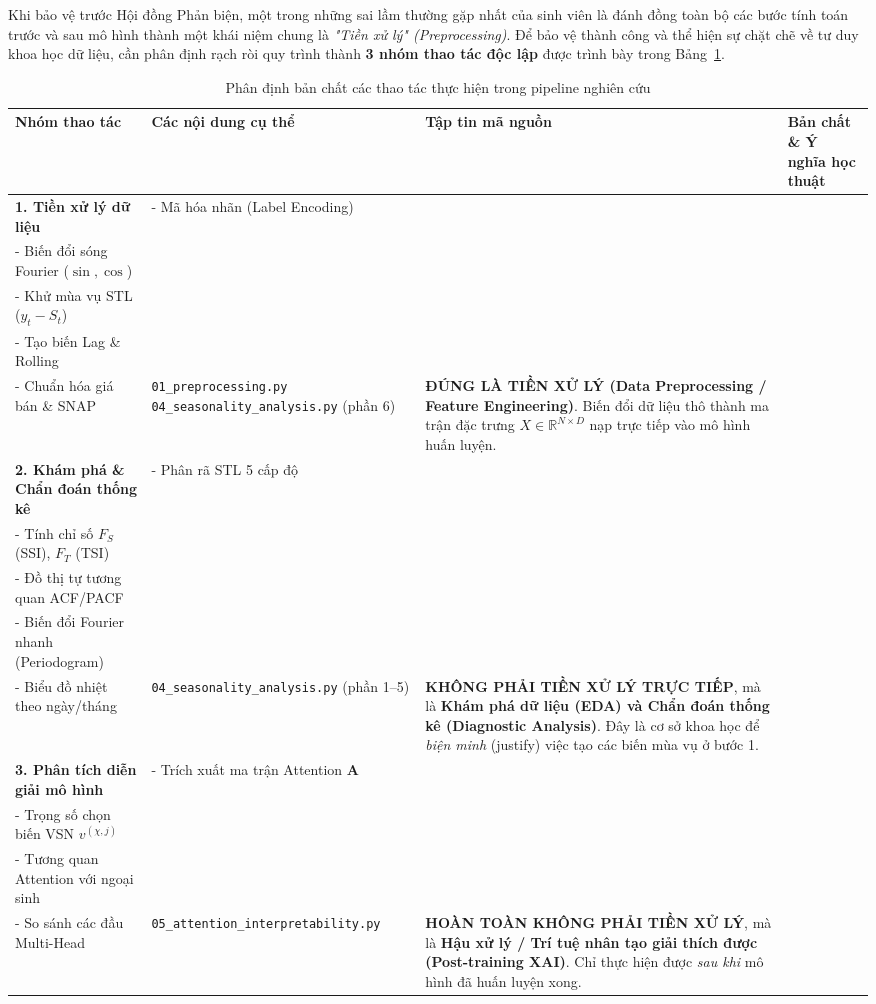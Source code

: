 \documentclass[12pt,a4paper,oneside]{article}
\begin{document}
Khi bảo vệ trước Hội đồng Phản biện, một trong những sai lầm thường gặp nhất của sinh viên là đánh đồng toàn bộ các bước tính toán trước và sau mô hình thành một khái niệm chung là \textit{"Tiền xử lý" (Preprocessing)}. Để bảo vệ thành công và thể hiện sự chặt chẽ về tư duy khoa học dữ liệu, cần phân định rạch ròi quy trình thành \textbf{3 nhóm thao tác độc lập} được trình bày trong Bảng~\ref{tab:phan_dinh_thao_tac}.

\begin{table}[htbp]
\centering
\small
\caption{Phân định bản chất các thao tác thực hiện trong pipeline nghiên cứu}
\label{tab:phan_dinh_thao_tac}
\begin{tabularx}{\textwidth}{l p{3.8cm} p{2.8cm} X}
\toprule
\textbf{Nhóm thao tác} & \textbf{Các nội dung cụ thể} & \textbf{Tập tin mã nguồn} & \textbf{Bản chất \& Ý nghĩa học thuật} \\
\midrule
\textbf{1. Tiền xử lý dữ liệu} & 
- Mã hóa nhãn (Label Encoding)\\
- Biến đổi sóng Fourier ($\sin, \cos$)\\
- Khử mùa vụ STL ($y_t - S_t$)\\
- Tạo biến Lag \& Rolling\\
- Chuẩn hóa giá bán \& SNAP &
\texttt{01\_preprocessing.py}\newline
\texttt{04\_seasonality\_analysis.py} (phần 6) &
\textbf{ĐÚNG LÀ TIỀN XỬ LÝ (Data Preprocessing / Feature Engineering)}. Biến đổi dữ liệu thô thành ma trận đặc trưng $X \in \mathbb{R}^{N \times D}$ nạp trực tiếp vào mô hình huấn luyện. \\
\addlinespace
\textbf{2. Khám phá \& Chẩn đoán thống kê} & 
- Phân rã STL 5 cấp độ\\
- Tính chỉ số $F_S$ (SSI), $F_T$ (TSI)\\
- Đồ thị tự tương quan ACF/PACF\\
- Biến đổi Fourier nhanh (Periodogram)\\
- Biểu đồ nhiệt theo ngày/tháng &
\texttt{04\_seasonality\_analysis.py} (phần 1--5) &
\textbf{KHÔNG PHẢI TIỀN XỬ LÝ TRỰC TIẾP}, mà là \textbf{Khám phá dữ liệu (EDA) và Chẩn đoán thống kê (Diagnostic Analysis)}. Đây là cơ sở khoa học để \textit{biện minh} (justify) việc tạo các biến mùa vụ ở bước 1. \\
\addlinespace
\textbf{3. Phân tích diễn giải mô hình} & 
- Trích xuất ma trận Attention $\mathbf{A}$\\
- Trọng số chọn biến VSN $v^{(\chi,j)}$\\
- Tương quan Attention với ngoại sinh\\
- So sánh các đầu Multi-Head &
\texttt{05\_attention\_interpretability.py} &
\textbf{HOÀN TOÀN KHÔNG PHẢI TIỀN XỬ LÝ}, mà là \textbf{Hậu xử lý / Trí tuệ nhân tạo giải thích được (Post-training XAI)}. Chỉ thực hiện được \textit{sau khi} mô hình đã huấn luyện xong. \\
\bottomrule
\end{tabularx}
\end{table}
\end{document}
